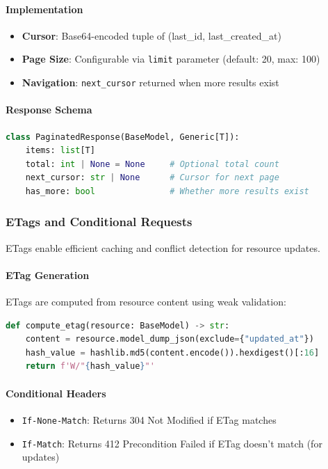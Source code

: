 \paragraph{Implementation}
\begin{itemize}
    \item \textbf{Cursor}: Base64-encoded tuple of (last\_id, last\_created\_at)
    \item \textbf{Page Size}: Configurable via \texttt{limit} parameter (default: 20, max: 100)
    \item \textbf{Navigation}: \texttt{next\_cursor} returned when more results exist
\end{itemize}

\paragraph{Response Schema}
\begin{lstlisting}[language=Python, caption={Paginated response model.}]
class PaginatedResponse(BaseModel, Generic[T]):
    items: list[T]
    total: int | None = None     # Optional total count
    next_cursor: str | None      # Cursor for next page
    has_more: bool               # Whether more results exist
\end{lstlisting}

\subsubsection{ETags and Conditional Requests}

ETags enable efficient caching and conflict detection for resource updates.

\paragraph{ETag Generation}
ETags are computed from resource content using weak validation:
\begin{lstlisting}[language=Python, caption={ETag generation for resources.}]
def compute_etag(resource: BaseModel) -> str:
    content = resource.model_dump_json(exclude={"updated_at"})
    hash_value = hashlib.md5(content.encode()).hexdigest()[:16]
    return f'W/"{hash_value}"'
\end{lstlisting}

\paragraph{Conditional Headers}
\begin{itemize}
    \item \texttt{If-None-Match}: Returns 304 Not Modified if ETag matches
    \item \texttt{If-Match}: Returns 412 Precondition Failed if ETag doesn't match (for updates)
\end{itemize}

